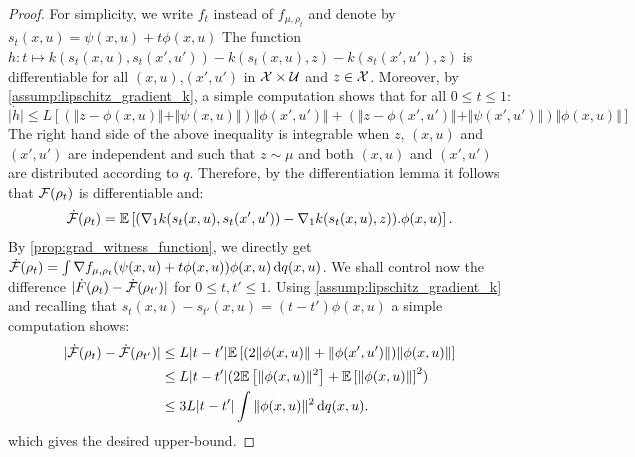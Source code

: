 \begin{proof}
For simplicity, we write $f_t$ instead of $f_{\mu,\rho_t}$ and denote by $s_t(x,u)= \psi(x,u)+t\phi(x,u)$
The function $h: t\mapsto k(s_t(x,u),s_t(x',u')) - k(s_t(x,u),z) - k(s_t(x',u'),z)$ is differentiable for all $(x,u)$,$(x',u')$ in ${{\mathcal X}}\times \mathcal{U}$ and $z\in {{\mathcal X}}$. 
Moreover, by \cref{assump:lipschitz_gradient_k}, a simple computation shows that for all $0\leq t\leq 1$:
\[
\vert \dot{h} \vert \leq L\left[ (\Vert z - \phi(x,u)\Vert + \Vert \psi(x,u)\Vert) \Vert \phi(x',u')\Vert +  
(\Vert z - \phi(x',u')\Vert + \Vert \psi(x',u')\Vert )\Vert \phi(x,u)\Vert \right]
\]
The right hand side of the above inequality is integrable when $z$,  $(x,u)$ and  $(x',u')$ are independent and such that $z\sim \mu$ and both $(x,u)$ and $(x',u')$ are distributed according to $q$. Therefore, by the differentiation lemma \cite[Theorem 6.28]{Klenke:2008} it follows that ${{\mathcal F}}(\rho_t)$ is differentiable and:
\begin{align}\label{eq:time_derivative_mmd}
\dot{{{\mathcal F}}}(\rho_t) = \mathbb{E}\left[(\nabla_1 k(s_t(x,u),s_t(x',u'))-\nabla_1 k(s_t(x,u),z)).\phi(x,u)\right].
\end{align}
By \cref{prop:grad_witness_function}, we directly get $\dot{{{\mathcal F}}}(\rho_t) = \int \nabla f_{\mu,\rho_t}(\psi(x,u)+t\phi(x,u)) \phi(x,u)\mathop{}\!\mathrm{d} q(x,u)$.
 We shall control now the difference $\vert \dot{F}(\rho_t)-\dot{{{\mathcal F}}}(\rho_{t'})\vert$ for $0\leq t,t'\leq 1$. Using \cref{assump:lipschitz_gradient_k} and recalling that $s_t(x,u)-s_{t'}(x,u)= (t-t')\phi(x,u)$ a simple computation shows:
\begin{align*}
	\vert\dot{{{\mathcal F}}}(\rho_t)-\dot{{{\mathcal F}}}(\rho_{t'}) \vert 
	&\leq L\vert t-t' \vert \mathbb{E}\left[(2\Vert \phi(x,u) \Vert + \Vert \phi(x',u')\Vert )\Vert \phi(x,u)\Vert  \right]\\
	  &\leq L\vert t-t'\vert(2\mathbb{E}\left[\Vert \phi(x,u)\Vert^2 \right]  + \mathbb{E}\left[\Vert \phi(x,u)\Vert \right]^2)\\
	 &\leq 3L\vert t-t'\vert\int\Vert \phi(x,u)\Vert^2 \mathop{}\!\mathrm{d} q(x,u).
\end{align*}
which gives the desired upper-bound.
\end{proof}


